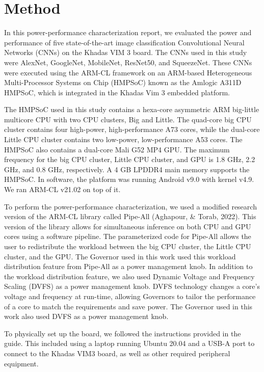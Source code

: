 \documentclass[a4paper, 12pt, fleqn]{article}
\begin{document}
\section{Method}
In this power-performance characterization report, we evaluated the power and performance of five state-of-the-art image classification Convolutional Neural Networks (CNNs) on the Khadas VIM 3 board. The CNNs used in this study were AlexNet, GoogleNet, MobileNet, ResNet50, and SqueezeNet. These CNNs were executed using the ARM-CL framework on an ARM-based Heterogeneous Multi-Processor Systems on Chip (HMPSoC) known as the Amlogic A311D HMPSoC, which is integrated in the Khadas Vim 3 embedded platform.

The HMPSoC used in this study contains a hexa-core asymmetric ARM big-little multicore CPU with two CPU clusters, Big and Little. The quad-core big CPU cluster contains four high-power, high-performance A73 cores, while the dual-core Little CPU cluster contains two low-power, low-performance A53 cores. The HMPSoC also contains a dual-core Mali G52 MP4 GPU. The maximum frequency for the big CPU cluster, Little CPU cluster, and GPU is 1.8 GHz, 2.2 GHz, and 0.8 GHz, respectively. A 4 GB LPDDR4 main memory supports the HMPSoC. In software, the platform was running Android v9.0 with kernel v4.9. We ran ARM-CL v21.02 on top of it.

To perform the power-performance characterization, we used a modified research version of the ARM-CL library called Pipe-All (Aghapour, \& Torab, 2022). This version of the library allows for simultaneous inference on both CPU and GPU cores using a software pipeline. The parameterized code for Pipe-All allows the user to redistribute the workload between the big CPU cluster, the Little CPU cluster, and the GPU. The Governor used in this work used this workload distribution feature from Pipe-All as a power management knob. In addition to the workload distribution feature, we also used Dynamic Voltage and Frequency Scaling (DVFS) as a power management knob. DVFS technology changes a core’s voltage and frequency at run-time, allowing Governors to tailor the performance of a core to match the requirements and save power. The Governor used in this work also used DVFS as a power management knob.

To physically set up the board, we followed the instructions provided in the guide. This included using a laptop running Ubuntu 20.04 and a USB-A port to connect to the Khadas VIM3 board, as well as other required peripheral equipment. 
\end{document}
